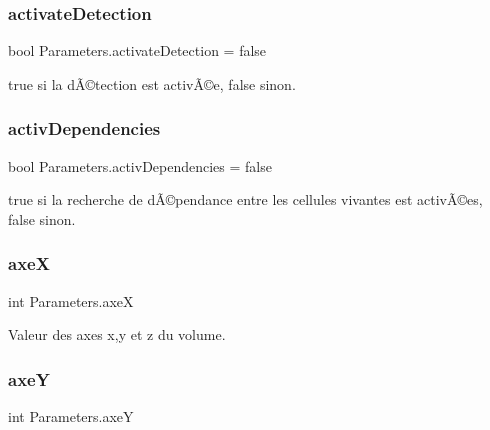 \subsubsection{\texorpdfstring{activate\+Detection}{activateDetection}}
{\footnotesize\ttfamily bool Parameters.\+activate\+Detection = false\hspace{0.3cm}{\ttfamily [private]}}



true si la dÃ©tection est activÃ©e, false sinon. 

\mbox{\label{class_parameters_a69b261ceea3746beb517d7082a8fc810}} 
\subsubsection{\texorpdfstring{activ\+Dependencies}{activDependencies}}
{\footnotesize\ttfamily bool Parameters.\+activ\+Dependencies = false\hspace{0.3cm}{\ttfamily [private]}}



true si la recherche de dÃ©pendance entre les cellules vivantes est activÃ©es, false sinon. 

\mbox{\label{class_parameters_ad1ebedc3a59e983f8bb3f4816cbe0969}} 
\subsubsection{\texorpdfstring{axeX}{axeX}}
{\footnotesize\ttfamily int Parameters.\+axeX\hspace{0.3cm}{\ttfamily [private]}}



Valeur des axes x,y et z du volume. 

\mbox{\label{class_parameters_a30e0f9fdc5cff2253f40ab0206f1b748}} 
\subsubsection{\texorpdfstring{axeY}{axeY}}
{\footnotesize\ttfamily int Parameters.\+axeY\hspace{0.3cm}{\ttfamily [private]}}

